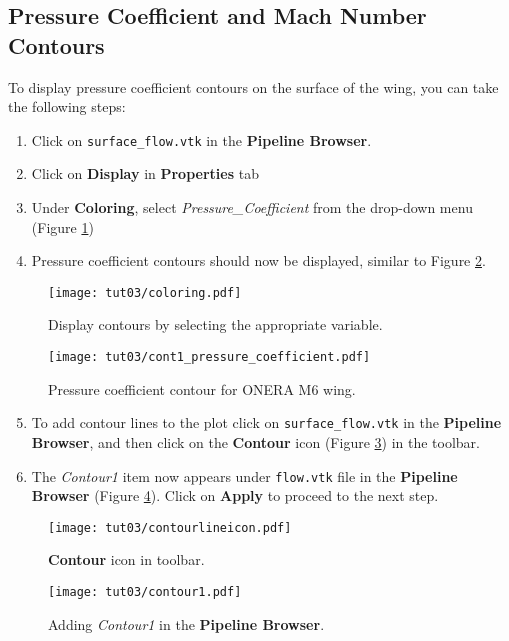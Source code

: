 \subsection{Pressure Coefficient and Mach Number Contours}
To display pressure coefficient contours on the surface of the wing, you can take the following steps:
\begin{enumerate}[label=\arabic*)]
	\item Click on \texttt{surface\_flow.vtk} in the \textbf{Pipeline Browser}.
	\item Click on \textbf{Display} in \textbf{Properties} tab
	\item Under \textbf{Coloring}, select \textit{Pressure\_Coefficient} from the drop-down menu (Figure \ref{fig3:pressure_coeff_1})
	\item Pressure coefficient contours should now be displayed, similar to Figure \ref{fig3:plot_pressure_coeff}.
\end{enumerate}
\begin{figure}[ht]
    \centering
    \texttt{[image: tut03/coloring.pdf]}
    \caption{Display contours by selecting the appropriate variable.}
    \label{fig3:pressure_coeff_1}
\end{figure}
\begin{figure}[ht]
    \centering
    \texttt{[image: tut03/cont1\_pressure\_coefficient.pdf]}
    \caption{Pressure coefficient contour for ONERA M6 wing.}
    \label{fig3:plot_pressure_coeff}
\end{figure}
\begin{enumerate}[label=\arabic*)]
	\setcounter{enumi}{4}
	\item To add contour lines to the plot click on \texttt{surface\_flow.vtk} in the \textbf{Pipeline Browser}, and then click on the \textbf{Contour} icon (Figure \ref{fig3:contour_icon}) in the toolbar.
	\item The \textit{Contour1} item now appears under \texttt{flow.vtk} file in the \textbf{Pipeline Browser} (Figure \ref{fig3:contour1}). Click on \textbf{Apply} to proceed to the next step.
\end{enumerate}
\begin{figure}[ht]
    \centering
    \texttt{[image: tut03/contourlineicon.pdf]}
    \caption{\textbf{Contour} icon in toolbar.}
    \label{fig3:contour_icon}
\end{figure}
\begin{figure}[H]
    \centering
    \texttt{[image: tut03/contour1.pdf]}
    \caption{Adding \textit{Contour1} in the \textbf{Pipeline Browser}.}
    \label{fig3:contour1}
\end{figure}
